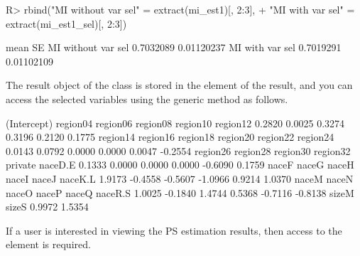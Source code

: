 \documentclass[
]{jss}
\begin{document}
\begin{CodeChunk}
\begin{CodeInput}
R> rbind("MI without var sel" = extract(mi_est1)[, 2:3],
+       "MI with var sel"    = extract(mi_est1_sel)[, 2:3])
\end{CodeInput}
\begin{CodeOutput}
                        mean         SE
MI without var sel 0.7032089 0.01120237
MI with var sel    0.7019291 0.01102109
\end{CodeOutput}
\end{CodeChunk}

The result object of the  class is stored in the
 element of the result, and you can access the selected
variables using the  generic method as follows.

\begin{CodeChunk}
\begin{CodeOutput}
(Intercept)    region04    region06    region08    region10    region12 
     0.2820      0.0025      0.3274      0.3196      0.2120      0.1775 
   region14    region16    region18    region20    region22    region24 
     0.0143      0.0792      0.0000      0.0000      0.0047     -0.2554 
   region26    region28    region30    region32     private     naceD.E 
     0.1333      0.0000      0.0000      0.0000     -0.6090      0.1759 
      naceF       naceG       naceH       naceI       naceJ     naceK.L 
     1.9173     -0.4558     -0.5607     -1.0966      0.9214      1.0370 
      naceM       naceN       naceO       naceP       naceQ     naceR.S 
     1.0025     -0.1840      1.4744      0.5368     -0.7116     -0.8138 
      sizeM       sizeS 
     0.9972      1.5354 
\end{CodeOutput}
\end{CodeChunk}

If a user is interested in viewing the PS estimation results, then
access to the  element is required.
\end{document}
